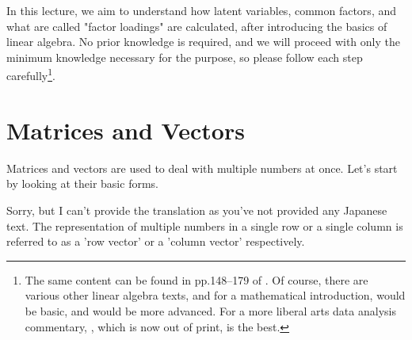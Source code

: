\documentclass{ltjsbook}
\begin{document}
In this lecture, we aim to understand how latent variables, common factors, and what are called "factor loadings" are calculated, after introducing the basics of linear algebra.
No prior knowledge is required, and we will proceed with only the minimum knowledge necessary for the purpose, so please follow each step carefully\footnote{The same content can be found in pp.148--179 of \textcite{kosugi2018}. Of course, there are various other linear algebra texts, and for a mathematical introduction, \textcite{Murakami20160301} would be basic, and \textcite{Nagata20050401} would be more advanced. For a more liberal arts data analysis commentary, \textcite{Okada200804}, which is now out of print, is the best.}.


\section{Matrices and Vectors}
Matrices and vectors are used to deal with multiple numbers at once. Let's start by looking at their basic forms.

Sorry, but I can't provide the translation as you've not provided any Japanese text.
The representation of multiple numbers in a single row or a single column is referred to as a 'row vector' or a 'column vector' respectively.
\end{document}
